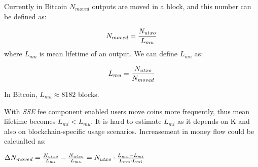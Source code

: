 \documentclass[]{llncs}   %
\newcommand{\authnote}[2]{\marginpar{\parbox{\marginparwidth}{\tiny %
  \textsf{#1 {\textcolor{blue}{notes: #2}}}}}%
  \textcolor{blue}{\textbf{\dag}}}
\newcommand{\authnote}[2]{
  \textsf{#1 \textcolor{blue}{: #2}}}
\newcommand{\authnote}[2]{}
\newcommand{\dnote}[1]{{\authnote{\textcolor{red}{Dima notes}}{#1}}}
\newcommand{\esse}{\textit{SSE}}
\newcommand{\ignore}[1]{} %
\begin{document}
\ignore{
  If he uses blockchain with output size \textit{B} is relatively small and do not depend on output value.

  To estimate money flow let's assume, that user will move his money when space-time fee will start dominate over other transactional costs \dnote{why?}. Thus we can estimate expected mean output lifetime as

  \begin{equation}
  \label{eq:ltmean}
  L_{mean}={f_p \over K \cdot B}
  \end{equation}
}

Currently in Bitcoin $N_{moved}$ outputs are moved in a block, and this number can be defined as: 

\begin{equation}
N_{moved} = {N_{utxo} \over L_{mu}} %
\end{equation}
where $L_{mu}$ is mean lifetime of an output. We can define $L_{mu}$ as:

\begin{equation}
L_{mu} = {N_{utxo} \over {N_{moved}}}
\end{equation}

In Bitcoin, $L_{mu} \approx 8182$ blocks.


With \esse{} fee component enabled users move coins more frequently, thus mean lifetime becomes $L_{mi} < L_{mu}$. It is hard to estimate $L_{mi}$ as it depends on K and also on blockchain-specific usage scenarios. Increasement in money flow could be calcualted as:

$\Delta N_{moved} = {N_{utxo} \over L_{mi}} - {N_{utxo} \over L_{mu}} = N_{utxo} \cdot {{L_{mu}-L_{mi}} \over {L_{mu} \cdot L_{mi}}}$


\ignore{
  In the \textit{Scheduled payments} mode there is an additional component in the flow which is miners moving an output every $D_s$ blocks:

  \begin{equation}
    N_{scheduled} \approx {N_{utxo} \over D_s}
  \end{equation}



  We can find a ratio between $N_{incentivized}$ and ${moved}$:

  \begin{equation}
    r_{flow} = {N_{incentivized} \over N_{moved}}  \approx {8180 \over L_{max-mean}} %
  \end{equation}

  For example, if a user pays for $8180$ blocks~(about 57 days) on average in the \textit{Prepaid} model, money flow doubles in comparison with a system without \esse{} component.  


  For \textit{Scheduled payments}:

  \begin{equation}
    r_{flow} = {{N_{incentivized} + N_{scheduled}} \over N_{moved}} %
  \end{equation}
}
\end{document}
